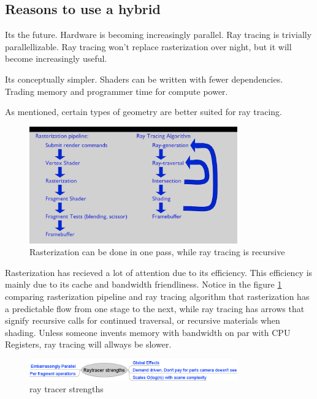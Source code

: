 \subsection{Reasons to use a hybrid}

Its the future. Hardware is becoming increasingly parallel. Ray tracing is trivially parallellizable. Ray tracing won't replace rasterization over night, but it will become increasingly useful.

Its conceptually simpler. Shaders can be written with fewer dependencies. Trading memory and programmer time for compute power.

As mentioned, certain types of geometry are better suited for ray tracing.

	\begin{figure}[ht]
		\centering
		\includegraphics[width=0.80\textwidth]{Media/why_hybrid_pipeline_diffs.png}
		\caption{Rasterization can be done in one pass, while ray tracing is recursive}
		\label{fig:pipelines}
	\end{figure}

Rasterization has recieved a lot of attention due to its efficiency. This efficiency is mainly due to its cache and bandwidth friendliness. Notice in the figure \ref{fig:pipelines} comparing rasterization pipeline and ray tracing algorithm that rasterization has a predictable flow from one stage to the next, while ray tracing has arrows that signify recursive calls for continued traversal, or recursive materials when shading. Unless someone invents memory with bandwidth on par with CPU Registers, ray tracing will allways be slower.

	\begin{figure}[ht]
		\centering \includegraphics[width=0.80\textwidth]{Media/why_hybrid_raymindmap.png}
		\caption{ray tracer strengths}
		\label{fig:ray_mmap}
	\end{figure}
	
